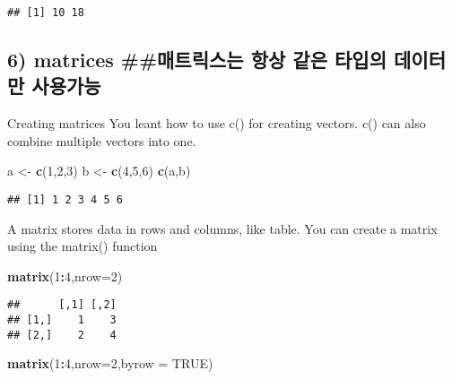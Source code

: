 \documentclass[
]{article}
\newenvironment{Shaded}{\begin{snugshade}}{\end{snugshade}}
\newcommand{\DataTypeTok}[1]{\textcolor[rgb]{0.13,0.29,0.53}{#1}}
\newcommand{\DecValTok}[1]{\textcolor[rgb]{0.00,0.00,0.81}{#1}}
\newcommand{\KeywordTok}[1]{\textcolor[rgb]{0.13,0.29,0.53}{\textbf{#1}}}
\newcommand{\NormalTok}[1]{#1}
\newcommand{\OperatorTok}[1]{\textcolor[rgb]{0.81,0.36,0.00}{\textbf{#1}}}
\newcommand{\OtherTok}[1]{\textcolor[rgb]{0.56,0.35,0.01}{#1}}
\newcommand{\StringTok}[1]{\textcolor[rgb]{0.31,0.60,0.02}{#1}}
\begin{document}
\begin{verbatim}
## [1] 10 18
\end{verbatim}

\hypertarget{matrices-uxb9e4uxd2b8uxb9aduxc2a4uxb294-uxd56duxc0c1-uxac19uxc740-uxd0c0uxc785uxc758-uxb370uxc774uxd130uxb9cc-uxc0acuxc6a9uxac00uxb2a5}{%
\subsection{6) matrices \#\#매트릭스는 항상 같은 타입의 데이터만
사용가능}\label{matrices-uxb9e4uxd2b8uxb9aduxc2a4uxb294-uxd56duxc0c1-uxac19uxc740-uxd0c0uxc785uxc758-uxb370uxc774uxd130uxb9cc-uxc0acuxc6a9uxac00uxb2a5}}

Creating matrices You leant how to use c() for creating vectors. c() can
also combine multiple vectors into one.

\begin{Shaded}
\begin{Highlighting}[]
\NormalTok{a <-}\StringTok{ }\KeywordTok{c}\NormalTok{(}\DecValTok{1}\NormalTok{,}\DecValTok{2}\NormalTok{,}\DecValTok{3}\NormalTok{)}
\NormalTok{b <-}\StringTok{ }\KeywordTok{c}\NormalTok{(}\DecValTok{4}\NormalTok{,}\DecValTok{5}\NormalTok{,}\DecValTok{6}\NormalTok{)}
\KeywordTok{c}\NormalTok{(a,b)}
\end{Highlighting}
\end{Shaded}

\begin{verbatim}
## [1] 1 2 3 4 5 6
\end{verbatim}

A matrix stores data in rows and columns, like table. You can create a
matrix using the matrix() function

\begin{Shaded}
\begin{Highlighting}[]
\KeywordTok{matrix}\NormalTok{(}\DecValTok{1}\OperatorTok{:}\DecValTok{4}\NormalTok{,}\DataTypeTok{nrow=}\DecValTok{2}\NormalTok{)}
\end{Highlighting}
\end{Shaded}

\begin{verbatim}
##      [,1] [,2]
## [1,]    1    3
## [2,]    2    4
\end{verbatim}

\begin{Shaded}
\begin{Highlighting}[]
\KeywordTok{matrix}\NormalTok{(}\DecValTok{1}\OperatorTok{:}\DecValTok{4}\NormalTok{,}\DataTypeTok{nrow=}\DecValTok{2}\NormalTok{,}\DataTypeTok{byrow =} \OtherTok{TRUE}\NormalTok{)}
\end{Highlighting}
\end{Shaded}
\end{document}
